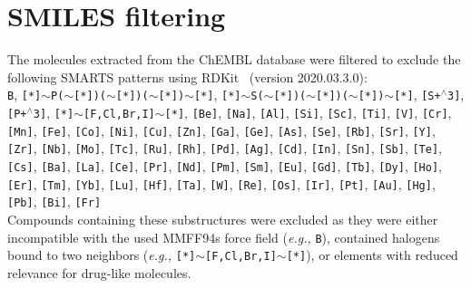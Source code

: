 \section{SMILES filtering}
The molecules extracted from the ChEMBL database were filtered to exclude the following SMARTS patterns using RDKit~\cite{rdkit} (version 2020.03.3.0): \\

\texttt{B}, \texttt{[*]$\sim$P($\sim$[*])($\sim$[*])($\sim$[*])$\sim$[*]}, \texttt{[*]$\sim$S($\sim$[*])($\sim$[*])($\sim$[*])$\sim$[*]}, \texttt{[S+$^\wedge$3]}, \texttt{[P+$^\wedge$3]}, \newline 
\texttt{[*]$\sim$[F,Cl,Br,I]$\sim$[*]}, \texttt{[Be]}, \texttt{[Na]}, \texttt{[Al]}, \texttt{[Si]}, \texttt{[Sc]}, \texttt{[Ti]}, \texttt{[V]}, \texttt{[Cr]}, \texttt{[Mn]}, \texttt{[Fe]}, \texttt{[Co]}, \texttt{[Ni]}, \texttt{[Cu]}, \texttt{[Zn]}, \texttt{[Ga]}, \texttt{[Ge]}, \texttt{[As]}, \texttt{[Se]}, \texttt{[Rb]}, \texttt{[Sr]}, \texttt{[Y]}, \texttt{[Zr]}, \texttt{[Nb]}, \texttt{[Mo]}, \texttt{[Tc]}, \texttt{[Ru]}, \texttt{[Rh]}, \texttt{[Pd]}, \texttt{[Ag]}, \texttt{[Cd]}, \texttt{[In]}, \texttt{[Sn]}, \texttt{[Sb]}, \texttt{[Te]}, \texttt{[Cs]}, \texttt{[Ba]}, \texttt{[La]}, \texttt{[Ce]}, \texttt{[Pr]}, \texttt{[Nd]}, \texttt{[Pm]}, \texttt{[Sm]}, \texttt{[Eu]}, \texttt{[Gd]}, \texttt{[Tb]}, \texttt{[Dy]}, \texttt{[Ho]}, \texttt{[Er]}, \texttt{[Tm]}, \texttt{[Yb]}, \texttt{[Lu]}, \texttt{[Hf]}, \texttt{[Ta]}, \texttt{[W]}, \texttt{[Re]}, \texttt{[Os]}, \texttt{[Ir]}, \texttt{[Pt]}, \texttt{[Au]}, \texttt{[Hg]}, \texttt{[Pb]}, \texttt{[Bi]}, \texttt{[Fr]}
\\

Compounds containing these substructures were excluded as they were either incompatible with the used MMFF94s force field\cite{tosco2014bringing} (\textit{e.g.,} \texttt{B}), contained halogens bound to two neighbors (\textit{e.g.,} \texttt{[*]$\sim$[F,Cl,Br,I]$\sim$[*]}), or elements with reduced relevance for drug-like molecules.
